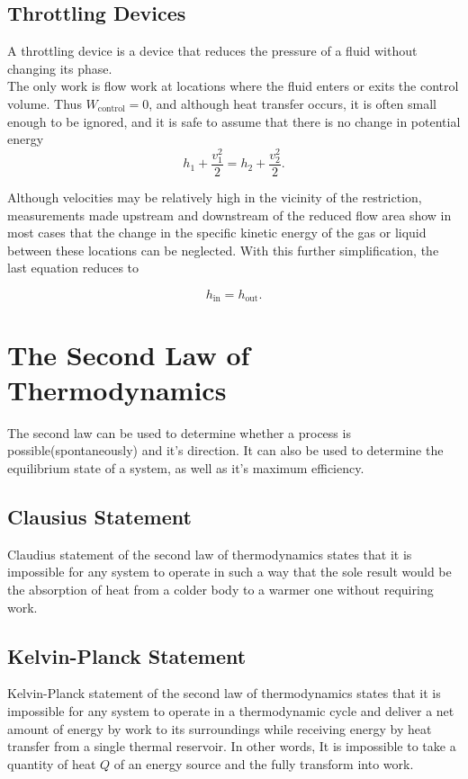 \documentclass{report}
\begin{document}
\section{Throttling Devices}

A throttling device is a device that reduces the pressure of a fluid without changing its phase. \\

The only work is flow work at locations where the fluid enters or exits the control volume. Thus $W_\text{control} = 0$, and although heat transfer occurs, it is often small enough to be ignored, and it is safe to assume that there is no change in potential energy
\[
	h_1 + \frac{v_1^2}{2} = h_2 + \frac{v_2^2}{2}
	.\]

Although velocities may be relatively high in the vicinity of the restriction, measurements made upstream and downstream of the reduced flow area show in most cases that the change in the specific kinetic energy of the gas or liquid between these locations can be neglected. With this further simplification, the last equation reduces to

\[
	h_\text{in} = h_\text{out}
	.\]

\chapter{The Second Law of Thermodynamics}

The second law can be used to determine whether a process is possible(spontaneously) and it's direction. It can also be used to determine the equilibrium state of a system, as well as it's maximum efficiency. \\

\section{Clausius Statement}

Claudius statement of the second law of thermodynamics states that it is impossible for any system to operate in such a way that the sole result would be the absorption of heat from a colder body to a warmer one without requiring work.

\section{Kelvin-Planck Statement}

Kelvin-Planck statement of the second law of thermodynamics states that it is impossible for any system to operate in a thermodynamic cycle and deliver a net amount of energy by work to its surroundings while receiving energy by heat transfer from a single thermal reservoir. In other words, It is impossible to take a quantity of heat $Q$ of an energy source and the fully transform into work.
\end{document}
